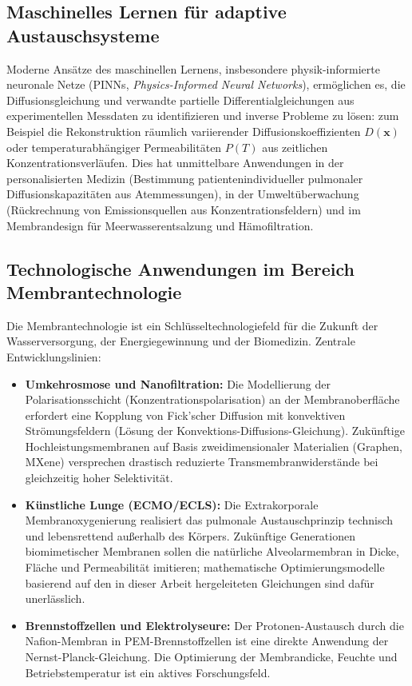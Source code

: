 ﻿\documentclass[a4paper,12pt]{article}
\theoremstyle{definition}
\begin{document}
\subsection{Maschinelles Lernen für adaptive Austauschsysteme}

Moderne Ansätze des maschinellen Lernens, insbesondere physik-informierte neuronale
Netze (PINNs, \emph{Physics-Informed Neural Networks}), ermöglichen es, die
Diffusionsgleichung und verwandte partielle Differentialgleichungen aus experimentellen
Messdaten zu identifizieren und inverse Probleme zu lösen: zum Beispiel die
Rekonstruktion räumlich variierender Diffusionskoeffizienten $D(\mathbf{x})$ oder
temperaturabhängiger Permeabilitäten $P(T)$ aus zeitlichen Konzentrationsverläufen.
Dies hat unmittelbare Anwendungen in der personalisierten Medizin (Bestimmung
patientenindividueller pulmonaler Diffusionskapazitäten aus Atemmessungen),
in der Umweltüberwachung (Rückrechnung von Emissionsquellen aus Konzentrationsfeldern)
und im Membrandesign für Meerwasserentsalzung und Hämofiltration.

\subsection{Technologische Anwendungen im Bereich Membrantechnologie}

Die Membrantechnologie ist ein Schlüsseltechnologiefeld für die Zukunft der
Wasserversorgung, der Energiegewinnung und der Biomedizin. Zentrale Entwicklungslinien:
\begin{itemize}
    \item \textbf{Umkehrosmose und Nanofiltration:} Die Modellierung der
          Polarisationsschicht (Konzentrationspolarisation) an der Membranoberfläche
          erfordert eine Kopplung von Fick'scher Diffusion mit konvektiven
          Strömungsfeldern (Lösung der Konvektions-Diffusions-Gleichung). Zukünftige
          Hochleistungsmembranen auf Basis zweidimensionaler Materialien (Graphen,
          MXene) versprechen drastisch reduzierte Transmembranwiderstände bei
          gleichzeitig hoher Selektivität.
    \item \textbf{Künstliche Lunge (ECMO/ECLS):} Die Extrakorporale
          Membranoxygenierung realisiert das pulmonale Austauschprinzip technisch
          und lebensrettend außerhalb des Körpers. Zukünftige Generationen biomimetischer
          Membranen sollen die natürliche Alveolarmembran in Dicke, Fläche und
          Permeabilität imitieren; mathematische Optimierungsmodelle basierend auf
          den in dieser Arbeit hergeleiteten Gleichungen sind dafür unerlässlich.
    \item \textbf{Brennstoffzellen und Elektrolyseure:} Der Protonen-Austausch durch
          die Nafion-Membran in PEM-Brennstoffzellen ist eine direkte Anwendung
          der Nernst-Planck-Gleichung. Die Optimierung der Membrandicke, Feuchte
          und Betriebstemperatur ist ein aktives Forschungsfeld.
\end{itemize}
\end{document}
